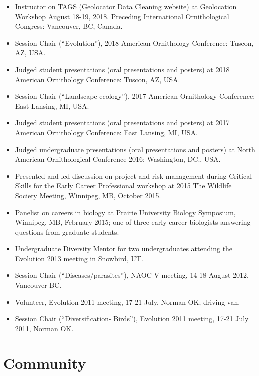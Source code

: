 \documentclass[
  letterpaper,
  DIV=11,
  numbers=noendperiod,
  oneside]{scrreprt}
\providecommand{\tightlist}{%
  \setlength{\itemsep}{0pt}\setlength{\parskip}{0pt}}\usepackage{longtable,booktabs,array}
\begin{document}
\begin{itemize}
\tightlist
\item
  Instructor on TAGS (Geolocator Data Cleaning website) at Geolocation
  Workshop August 18-19, 2018. Preceding International Ornithological
  Congress: Vancouver, BC, Canada.
\item
  Session Chair (``Evolution''), 2018 American Ornithology Conference:
  Tuscon, AZ, USA.
\item
  Judged student presentations (oral presentations and posters) at 2018
  American Ornithology Conference: Tuscon, AZ, USA.
\item
  Session Chair (``Landscape ecology''), 2017 American Ornithology
  Conference: East Lansing, MI, USA.
\item
  Judged student presentations (oral presentations and posters) at 2017
  American Ornithology Conference: East Lansing, MI, USA.
\item
  Judged undergraduate presentations (oral presentations and posters) at
  North American Ornithological Conference 2016: Washington, DC., USA.
\item
  Presented and led discussion on project and risk management during
  Critical Skills for the Early Career Professional workshop at 2015 The
  Wildlife Society Meeting, Winnipeg, MB, October 2015.
\item
  Panelist on careers in biology at Prairie University Biology
  Symposium, Winnipeg, MB, February 2015; one of three early career
  biologists answering questions from graduate students.
\item
  Undergraduate Diversity Mentor for two undergraduates attending the
  Evolution 2013 meeting in Snowbird, UT.
\item
  Session Chair (``Diseases/parasites''), NAOC-V meeting, 14-18 August
  2012, Vancouver BC.
\item
  Volunteer, Evolution 2011 meeting, 17-21 July, Norman OK; driving van.
\item
  Session Chair (``Diversification- Birds''), Evolution 2011 meeting,
  17-21 July 2011, Norman OK.
\end{itemize}

\section{Community}\label{community}
\end{document}
